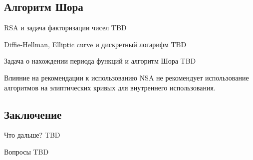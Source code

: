 \subsection{Алгоритм Шора}
\begin{frame}{RSA и задача факторизации чисел}
TBD
\end{frame}

\begin{frame}{Diffie-Hellman, Elliptic
curve и дискретный логарифм}
TBD
\end{frame}

\begin{frame}{Задача о нахождении периода функций и алгоритм Шора}
TBD
\end{frame}

\begin{frame}{Влияние на рекомендации к использованию}
NSA не рекомендует использование алгоритмов на элиптических кривых для
внутреннего использования.
\end{frame}

\subsection{Заключение}
\begin{frame}{Что дальше?}
TBD
\end{frame}

\begin{frame}{Вопросы}
TBD
\end{frame}
